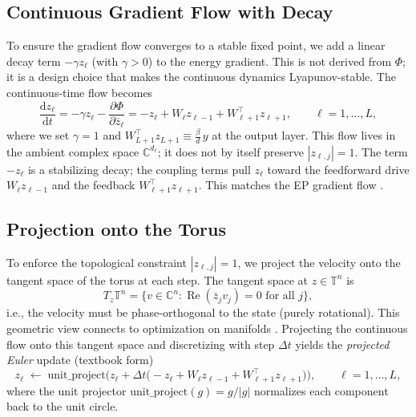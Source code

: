 \documentclass[11pt]{article}
\newcommand{\C}{\mathbb{C}}
\newcommand{\T}{\mathbb{T}}
\newcommand{\dd}{\mathrm{d}}
\newcommand{\dt}{\Delta t}
\newcommand{\unitproject}{\mathrm{unit\_project}}
\DeclareMathOperator{\Real}{Re}
\begin{document}
\subsection{Continuous Gradient Flow with Decay}\label{ssec:continuous-flow}

To ensure the gradient flow converges to a stable fixed point, we add a linear decay term $-\gamma z_\ell$ (with $\gamma > 0$) to the energy gradient. This is not derived from $\Phi$; it is a design choice that makes the continuous dynamics Lyapunov-stable. The continuous-time flow becomes
\begin{equation}\label{eq:continuous-flow}
\frac{\dd z_\ell}{\dd t} = -\gamma z_\ell - \frac{\partial \Phi}{\partial \bar{z}_\ell}
= -z_\ell + W_\ell z_{\ell-1} + W_{\ell+1}^\top z_{\ell+1},
\qquad \ell = 1,\dots,L,
\end{equation}
where we set $\gamma = 1$ and $W_{L+1}^\top z_{L+1} \equiv \frac{\beta}{d}\, y$ at the output layer. This flow lives in the ambient complex space $\C^{d_\ell}$; it does not by itself preserve $|z_{\ell,j}|=1$. The term $-z_\ell$ is a stabilizing decay; the coupling terms pull $z_\ell$ toward the feedforward drive $W_\ell z_{\ell-1}$ and the feedback $W_{\ell+1}^\top z_{\ell+1}$. This matches the EP gradient flow \citep{scellier2017equilibrium}.

\subsection{Projection onto the Torus}\label{ssec:projection}

To enforce the topological constraint $|z_{\ell,j}|=1$, we project the velocity onto the tangent space of the torus at each step. The tangent space at $z \in \T^n$ is
\begin{equation}
T_z\T^n = \{ v \in \C^n : \Real(\bar{z}_j v_j) = 0 \text{ for all } j \},
\end{equation}
i.e., the velocity must be phase-orthogonal to the state (purely rotational). This geometric view connects to optimization on manifolds \citep{olin2021deep}. Projecting the continuous flow onto this tangent space and discretizing with step $\dt$ yields the \emph{projected Euler} update (textbook form)
\begin{equation}\label{eq:discrete-settle-textbook}
z_\ell \;\leftarrow\; \unitproject\Big( z_\ell + \dt\big( -z_\ell + W_\ell z_{\ell-1} + W_{\ell+1}^\top z_{\ell+1} \big) \Big),
\qquad \ell = 1,\dots,L,
\end{equation}
where the unit projector $\unitproject(g) = g/|g|$ normalizes each component back to the unit circle.
\end{document}

